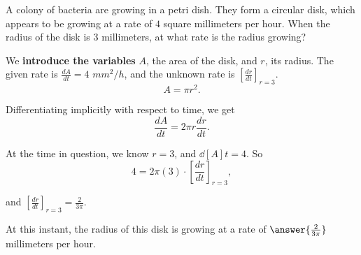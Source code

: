 \documentclass{ximera}
\author{Steven Gubkin\and Nela Lakos}
\begin{document}
\begin{exercise}



A colony of bacteria are growing in a petri dish.  They form a
circular disk, which appears to be growing at a rate of $4$ square
millimeters per hour.  When the radius of the disk is $3$ millimeters,
at what rate is the radius growing?

\begin{hint}
  We \textbf{introduce the variables} $A$, the area of the disk, and $r$,  its radius.  The given rate is $\frac{dA}{dt}=4$ $mm^2/h$, and the unknown rate is $\left[\frac{dr}{dt}\right]_{r=3}$.
  \[
  A = \pi r^2.
  \]
\end{hint}

\begin{hint}
  Differentiating implicitly with respect to time, we get
  \[
  \frac{dA}{dt} = 2\pi r \frac{dr}{dt}.
  \]
\end{hint}

\begin{hint}
  At the time in question, we know $r = 3$, and $\dd[A]{t} = 4$.
  So
  \[
  4 = 2 \pi (3)\cdot\left[\frac{dr}{dt}\right]_{r=3},
  \]

and $\left[\frac{dr}{dt}\right]_{r=3} = \frac{2}{3\pi}$.
\end{hint}

\begin{prompt}
  At this instant, the radius of this disk is growing at a rate
  of $\answer{\frac{2}{3\pi}}$ millimeters per hour.
\end{prompt}

\end{exercise}
\end{document}

